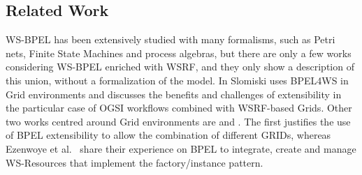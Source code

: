 %
\subsection{Related Work}

WS-BPEL has been extensively studied with many formalisms, such as
Petri nets, Finite State Machines and process algebras, but 
there are only a few works considering WS-BPEL enriched with 
WSRF, and they only show a description of this union, 
without a formalization of the model.
In \cite{Slomiski:2006} Slomiski uses BPEL4WS in Grid environments and discusses the
benefits and challenges of extensibility in the particular case of OGSI workflows
combined with WSRF-based Grids. Other two works centred around Grid environments are 
\cite{Leymann:2006} and \cite{Ezenwoye:2007}. The first justifies 
the use of BPEL extensibility to allow the combination of different GRIDs, whereas
Ezenwoye et al.~\cite{Ezenwoye:2007} share their experience on BPEL to integrate,
create and manage WS-Resources that implement the factory/instance pattern.

